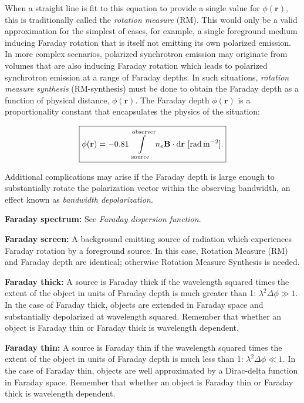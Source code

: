 \documentclass[a4paper,11pt]{article}
\begin{document}
{\noindent}When a straight line is fit to this equation to provide a single value for $\phi(\mathbf{r})$, this is traditionally called the \textit{rotation measure} (RM). This would only be a valid approximation for the simplest of cases, for example, a single foreground medium inducing Faraday rotation that is itself not emitting its own polarized emission. In more complex scenarios, polarized synchrotron emission may originate from volumes that are also inducing Faraday rotation which leads to polarized synchrotron emission at a range of Faraday depths. In such situations, \textit{rotation measure synthesis} (RM-synthesis) must be done to obtain the Faraday depth as a function of physical distance, $\phi(\mathbf{r})$. The Faraday depth $\phi(\mathbf{r})$ is a proportionality constant that encapsulates the physics of the situation:

\begin{align*}
    \boxed{\phi(\mathbf{r}) = -0.81 \int\limits_\mathrm{source}^\mathrm{observer}n_e\mathbf{B}\cdot \mathrm{d}\mathbf{r} ~ [{\rm rad\,m^{-2}}]. }
\end{align*}

{\noindent}Additional complications may arise if the Faraday depth is large enough to substantially rotate the polarization vector within the observing bandwidth, an effect known as \textit{bandwidth depolarization}.

{\noindent}\textbf{Faraday spectrum:} See \textit{Faraday dispersion function}.

{\noindent}\textbf{Faraday screen:} A background emitting source of radiation which experiences Faraday rotation by a foreground source. In this case, Rotation Measure (RM) and Faraday depth are identical; otherwise Rotation Measure Synthesis is needed.

{\noindent}\textbf{Faraday thick:} A source is Faraday thick if the wavelength squared times the extent of the object in units of Faraday depth is much greater than 1: $\lambda^2\Delta\phi\gg1$. In the case of Faraday thick, objects are extended in Faraday space and substantially depolarized at wavelength squared. Remember that whether an object is Faraday thin or Faraday thick is wavelength dependent.

{\noindent}\textbf{Faraday thin:} A source is Faraday thin if the wavelength squared times the extent of the object in units of Faraday depth is much less than 1: $\lambda^2\Delta\phi\ll1$. In the case of Faraday thin, objects are well approximated by a Dirac-delta function in Faraday space. Remember that whether an object is Faraday thin or Faraday thick is wavelength dependent.
\end{document}
